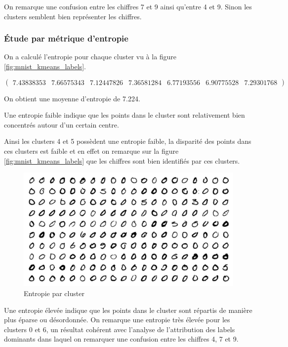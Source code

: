 \documentclass[french,a4paper,18pt]{article}
\begin{document}
On remarque une confusion entre les chiffres 7 et 9 ainsi qu'entre 4 et 9.
Sinon les clusters semblent bien représenter les chiffres.

\subsubsection{Étude par métrique d'entropie}

On a calculé l'entropie pour chaque cluster vu à la figure \ref{fig:mnist_kmeans_labels}.

\[
\begin{pmatrix}
    7.43838353 & 7.66575343 & 7.12447826 & 7.36581284 & 6.77193556 & 6.90775528 & 7.29301768
\end{pmatrix}
\]

On obtient une moyenne d'entropie de 7.224.

Une entropie faible indique que les points dans le cluster sont relativement bien concentrés autour d'un certain centre.

Ainsi les clusters 4 et 5 possèdent une entropie faible, la disparité des points dans ces clusters est faible
et en effet on remarque sur la figure \ref{fig:mnist_kmeans_labels} que les chiffres sont bien identifiés par ces clusters. 

\begin{figure}[h!]
    \centering
    \includegraphics[scale=0.3]{../images/mnist_kmeans_low_entropy_cluster.png}
    \caption{Entropie par cluster}\label{fig:mnist_kmeans_entropy}
\end{figure}


Une entropie élevée indique que les points dans le cluster sont répartis de manière plus éparse ou désordonnée.
On remarque une entropie très élevée pour les clusters 0 et 6, un résultat cohérent 
avec l'analyse de l'attribution des labels dominants dans laquel on remarquer une confusion entre les chiffres 4, 7 et 9.
\end{document}
